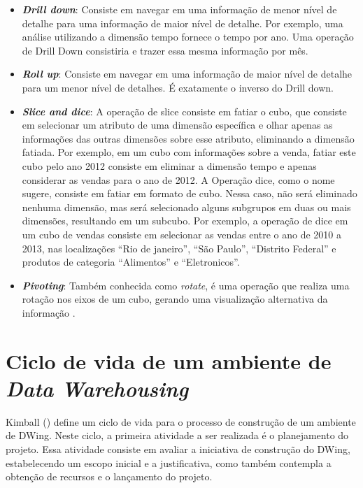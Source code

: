 \begin{itemize}
\item \textbf{\emph{Drill down}}: Consiste em navegar em uma informação de menor nível de detalhe para uma informação de maior nível de detalhe. Por exemplo, uma análise utilizando a dimensão tempo fornece o tempo por ano. Uma operação de Drill Down consistiria e trazer essa mesma informação por mês.
\item \textbf{\emph{Roll up}}: Consiste em navegar em uma informação de maior nível de detalhe para um menor nível de detalhes. É exatamente o inverso do Drill down.
\item \textbf{\emph{Slice and dice}}: A operação de slice consiste em fatiar o cubo, que consiste em selecionar um atributo de uma dimensão específica e olhar apenas as informações das outras dimensões sobre esse atributo, eliminando a dimensão fatiada. Por exemplo, em um cubo com informações sobre a venda,  fatiar este cubo pelo ano 2012 consiste em eliminar a dimensão tempo e apenas considerar as vendas para o ano de 2012. A Operação dice, como o nome sugere, consiste em fatiar em formato de cubo. Nessa caso, não será eliminado nenhuma dimensão, mas será selecionado alguns subgrupos em duas ou mais dimensões, resultando em um subcubo. Por exemplo,  a operação de dice em um cubo de vendas consiste em selecionar as vendas entre o ano de 2010 a 2013, nas localizações “Rio de janeiro”, “São Paulo”, “Distrito Federal” e produtos de categoria “Alimentos” e “Eletronicos”.
\item \textbf{\emph{Pivoting}}: Também conhecida como \emph{rotate}, é uma operação que realiza uma rotação nos eixos de um cubo, gerando uma visualização alternativa da informação \cite{cavalcanti2012}. 
\end{itemize}

%

\section{Ciclo de vida de um ambiente de \emph{Data Warehousing}}
\label{sec-lifecycleDw}
%

Kimball (\citeyear{kimball2002}) define um ciclo de vida para o processo de construção de um ambiente de DWing. Neste ciclo, a primeira atividade a ser realizada é o planejamento do projeto. Essa atividade consiste em avaliar a iniciativa de construção do DWing, estabelecendo um escopo inicial e a justificativa, como também contempla a obtenção  de recursos e o lançamento do projeto.

